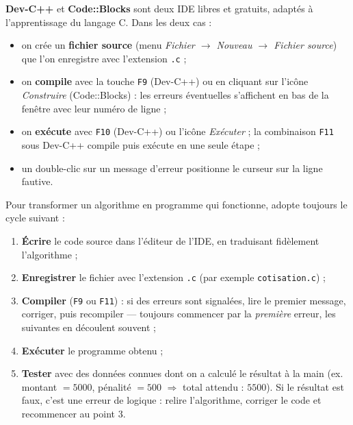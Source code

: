 \documentclass[11pt]{article}
\begin{document}
\begin{propriete}
\textbf{Dev-C++} et \textbf{Code::Blocks} sont deux IDE libres et gratuits, adaptés à l'apprentissage du langage C. Dans les deux cas :
\begin{itemize}
\item on crée un \textbf{fichier source} (menu \emph{Fichier $\to$ Nouveau $\to$ Fichier source}) que l'on enregistre avec l'extension \texttt{.c} ;
\item on \textbf{compile} avec la touche \texttt{F9} (Dev-C++) ou en cliquant sur l'icône \emph{Construire} (Code::Blocks) : les erreurs éventuelles s'affichent en bas de la fenêtre avec leur numéro de ligne ;
\item on \textbf{exécute} avec \texttt{F10} (Dev-C++) ou l'icône \emph{Exécuter} ; la combinaison \texttt{F11} sous Dev-C++ compile puis exécute en une seule étape ;
\item un double-clic sur un message d'erreur positionne le curseur sur la ligne fautive.
\end{itemize}
\end{propriete}

\begin{methode}
Pour transformer un algorithme en programme qui fonctionne, adopte toujours le cycle suivant :
\begin{enumerate}
\item \textbf{Écrire} le code source dans l'éditeur de l'IDE, en traduisant fidèlement l'algorithme ;
\item \textbf{Enregistrer} le fichier avec l'extension \texttt{.c} (par exemple \texttt{cotisation.c}) ;
\item \textbf{Compiler} (\texttt{F9} ou \texttt{F11}) : si des erreurs sont signalées, lire le premier message, corriger, puis recompiler — toujours commencer par la \emph{première} erreur, les suivantes en découlent souvent ;
\item \textbf{Exécuter} le programme obtenu ;
\item \textbf{Tester} avec des données connues dont on a calculé le résultat à la main (ex. montant $= 5000$, pénalité $= 500$ $\Rightarrow$ total attendu : $5500$). Si le résultat est faux, c'est une erreur de logique : relire l'algorithme, corriger le code et recommencer au point 3.
\end{enumerate}
\end{methode}
\end{document}
